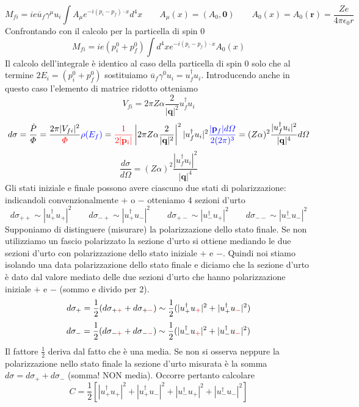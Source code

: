 $$
M_{fi} = ie\overline{u}_f \gamma^\mu u_i \int A_\mu e^{-i(p_i-p_f) \cdot x} d^4x \qquad A_\mu(x) = (A_0, \mathbf{0}) \qquad A_0(x) = A_0(\mathbf{r}) = \frac{Ze}{4\pi\epsilon_0 r}
$$
Confrontando con il calcolo per la particella di spin $0$
$$
M_{fi} = ie(p_i^0 + p_f^0) \int d^4x e^{-i(p_i-p_f) \cdot x} A_0(x)
$$
Il calcolo dell'integrale è identico al caso della particella di spin $0$ solo che al termine $2E_i=\left(p^0_i+p^0_f\right)$ sostituiamo $\overline{u}_f\gamma^0u_i=u_f^\dagger u_i$. Introducendo anche in questo caso l'elemento di matrice ridotto otteniamo
$$
V_{fi} = 2\pi Z\alpha \frac{2}{|\mathbf{q}|^2} u_f^\dagger u_i
$$
$$
d\sigma = \frac{\dot{P}}{\Phi} = \frac{2\pi |V_{fi}|^2}{\textcolor{red}{\Phi}} \textcolor{blue}{\rho(E_f)} = \textcolor{red}{\frac{1}{2|\mathbf{p}_i|}} \left| 2\pi Z\alpha \frac{2}{|\mathbf{q}|^2} \right|^2 |u_f^\dagger u_i|^2 \textcolor{blue}{\frac{|\mathbf{p}_f| d\Omega}{2(2\pi)^3}} = (Z\alpha)^2 \frac{|u_f^\dagger u_i|^2}{|\mathbf{q}|^4} d\Omega
$$
$$
\frac{d\sigma}{d\Omega} = (Z\alpha)^2 \frac{|u_f^\dagger u_i|^2}{|\mathbf{q}|^4}
$$
Gli stati iniziale e finale possono avere ciascuno due stati di polarizzazione: indicandoli convenzionalmente $+$ o $-$ otteniamo 4 sezioni d'urto
$$
d\sigma_{++} \sim |u_+^\dagger u_+|^2 \qquad d\sigma_{-+} \sim |u_+^\dagger u_-|^2 \qquad d\sigma_{+-} \sim |u_-^\dagger u_+|^2 \qquad d\sigma_{--} \sim |u_-^\dagger u_-|^2
$$
Supponiamo di distinguere (misurare) la polarizzazione dello stato finale. Se non utilizziamo un fascio polarizzato la sezione d'urto si ottiene mediando le due sezioni d'urto con polarizzazione dello stato iniziale $+$ e $-$. Quindi noi stiamo isolando una data polarizzazione dello stato finale e diciamo che la sezione d'urto è dato dal valore mediato delle due sezioni d'urto che hanno polarizzazione iniziale $+$ e $-$ (sommo e divido per $2$).
$$
d\sigma_{+} = \frac{1}{2} (d\sigma_{+\textcolor{red}{+}} + d\sigma_{+\textcolor{red}{-}}) \sim \frac{1}{2} (|u_+^\dagger u_{\textcolor{red}{+}}|^2 + |u_+^\dagger u_{\textcolor{red}{-}}|^2)
$$
$$
d\sigma_{-} = \frac{1}{2} (d\sigma_{-\textcolor{red}{+}} + d\sigma_{-\textcolor{red}{-}}) \sim \frac{1}{2} (|u_-^\dagger u_{\textcolor{red}{+}}|^2 + |u_-^\dagger u_{\textcolor{red}{-}}|^2)
$$
Il fattore $\frac{1}{2}$ deriva dal fatto che è una media. Se non si osserva neppure la polarizzazione nello stato finale la sezione d'urto misurata è la somma $d\sigma=d\sigma_++d\sigma_-$ (somma! NON media). Occorre pertanto calcolare
$$
C = \frac{1}{2} [|u_+^\dagger u_+|^2 + |u_+^\dagger u_-|^2 + |u_-^\dagger u_+|^2 + |u_-^\dagger u_-|^2]
$$

